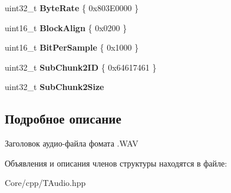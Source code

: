 \begin{DoxyCompactItemize}
uint32\+\_\+t {\bfseries Byte\+Rate} \{ 0x803\+E0000 \}
\item 
\mbox{\label{structunit_1_1_w_a_v_e___format_type_def_afeca7c3e397c7a74dfba2c9e95c742fe}} 
uint16\+\_\+t {\bfseries Block\+Align} \{ 0x0200 \}
\item 
\mbox{\label{structunit_1_1_w_a_v_e___format_type_def_a28a3107e2b41d854738777f30d68c293}} 
uint16\+\_\+t {\bfseries Bit\+Per\+Sample} \{ 0x1000 \}
\item 
\mbox{\label{structunit_1_1_w_a_v_e___format_type_def_a0e55392c0dcbbc5545adf57b2ce20d37}} 
uint32\+\_\+t {\bfseries Sub\+Chunk2\+ID} \{ 0x64617461 \}
\item 
\mbox{\label{structunit_1_1_w_a_v_e___format_type_def_aa74ef02ec296186ae44caf3300698633}} 
uint32\+\_\+t {\bfseries Sub\+Chunk2\+Size}
\end{DoxyCompactItemize}


\subsection{Подробное описание}
Заголовок аудио-\/файла фомата .W\+AV 

Объявления и описания членов структуры находятся в файле\+:\begin{DoxyCompactItemize}
\item 
Core/cpp/T\+Audio.\+hpp\end{DoxyCompactItemize}
